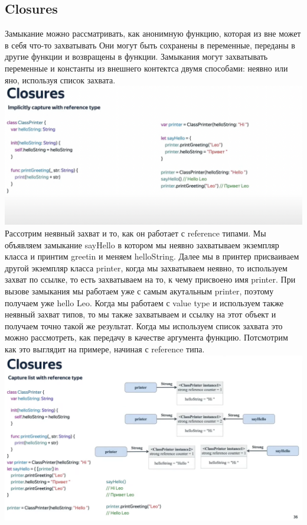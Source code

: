 \documentclass{article}
\begin{document}
    \subsection{Closures}
    Замыкание можно рассматривать, как анонимную функцию, которая из вне может в себя что-то захватывать
    \newline
    Они могут быть сохранены в переменные, переданы в другие функции и возвращены в функции. 
    \newline
    Замыкания могут захватывать переменные и константы из внешнего контектса двумя способами: неявно или яно, используя список захвата. 
    \newline
    \includegraphics[scale = 0.2]{pic/clousersSwiftAdv.png}
    \newline
    Рассотрим неявный захват и то, как он работает с reference типами. 
    \newline
    Мы объявляем замыкание sayHello в котором мы неявно захватываем экземпляр класса  и  принтим greetin и меняем helloString. Далее мы в принтер присваиваем другой экземпляр класса printer, когда мы захватываем неявно, то используем захват по ссылке, то есть захватываем на то, к чему присвоено имя printer. При вызове замыкания мы работаем уже с самым акутальным printer, поэтому получаем уже hello Leo. 
    \newline
    Когда мы работаем с value type и используем также неявный захват типов, то мы также захватываем и ссылку на этот объект и получаем точно такой же результат. 
    \newline
    Когда мы используем список захвата это можно рассмотреть, как передачу в качестве аргумента функцию. Потсмотрим как это выглядит на примере, начиная с reference типа. 
    \newline
    \includegraphics[scale = 0.2]{pic/ClosuerStrongAdvSwift.png}
\end{document}
